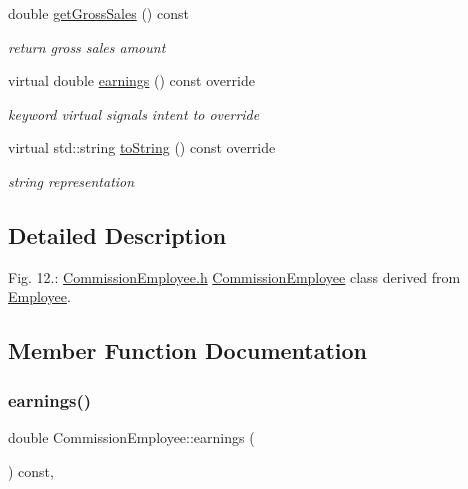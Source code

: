\begin{DoxyCompactItemize}
\mbox{\label{class_commission_employee_acafd14323207ade77db368b050be9376}} 
double \mbox{\hyperlink{class_commission_employee_acafd14323207ade77db368b050be9376}{get\+Gross\+Sales}} () const
\begin{DoxyCompactList}\small\item\em return gross sales amount \end{DoxyCompactList}\item 
virtual double \mbox{\hyperlink{class_commission_employee_aa7759d5908bd7357a9976c2c2740e9bb}{earnings}} () const override
\begin{DoxyCompactList}\small\item\em keyword virtual signals intent to override \end{DoxyCompactList}\item 
\mbox{\label{class_commission_employee_a9b0a2adfd93e4df96236b1e1758596f9}} 
virtual std\+::string \mbox{\hyperlink{class_commission_employee_a9b0a2adfd93e4df96236b1e1758596f9}{to\+String}} () const override
\begin{DoxyCompactList}\small\item\em string representation \end{DoxyCompactList}\end{DoxyCompactItemize}


\subsection{Detailed Description}
Fig. 12.\+: \mbox{\hyperlink{_commission_employee_8h_source}{Commission\+Employee.\+h}} \mbox{\hyperlink{class_commission_employee}{Commission\+Employee}} class derived from \mbox{\hyperlink{class_employee}{Employee}}. 

\subsection{Member Function Documentation}
\mbox{\label{class_commission_employee_aa7759d5908bd7357a9976c2c2740e9bb}} 
\subsubsection{\texorpdfstring{earnings()}{earnings()}}
{\footnotesize\ttfamily double Commission\+Employee\+::earnings (\begin{DoxyParamCaption}{ }\end{DoxyParamCaption}) const\hspace{0.3cm}{\ttfamily [override]}, {\ttfamily [virtual]}}



